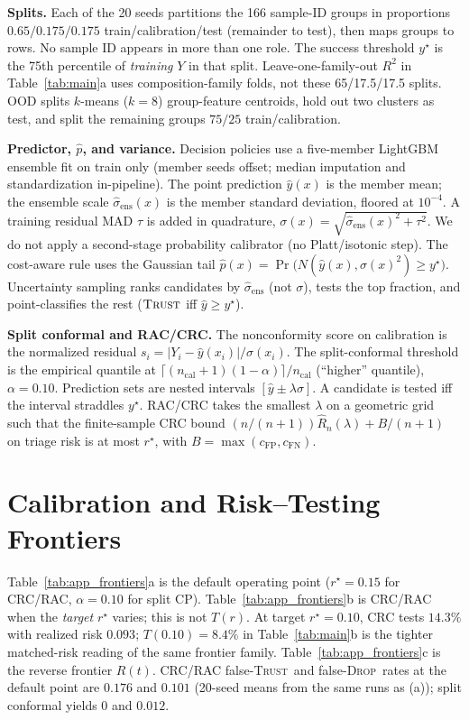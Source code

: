 \documentclass{article}
\newcommand{\trust}{\textsc{Trust}}
\newcommand{\dropa}{\textsc{Drop}}
\begin{document}
\textbf{Splits.}
Each of the 20 seeds partitions the 166 sample-ID groups in proportions $0.65/0.175/0.175$ train/calibration/test (remainder to test), then maps groups to rows.
No sample ID appears in more than one role.
The success threshold $y^\star$ is the 75th percentile of \emph{training} $Y$ in that split.
Leave-one-family-out $R^2$ in Table~\ref{tab:main}a uses composition-family folds, not these 65/17.5/17.5 splits.
OOD splits $k$-means ($k=8$) group-feature centroids, hold out two clusters as test, and split the remaining groups $75/25$ train/calibration.

\textbf{Predictor, $\hat p$, and variance.}
Decision policies use a five-member LightGBM ensemble fit on train only (member seeds offset; median imputation and standardization in-pipeline).
The point prediction $\hat y(x)$ is the member mean; the ensemble scale $\hat\sigma_{\mathrm{ens}}(x)$ is the member standard deviation, floored at $10^{-4}$.
A training residual MAD $\tau$ is added in quadrature,
$\sigma(x)=\sqrt{\hat\sigma_{\mathrm{ens}}(x)^2+\tau^2}$.
We do not apply a second-stage probability calibrator (no Platt/isotonic step).
The cost-aware rule uses the Gaussian tail
$\hat p(x)=\Pr\bigl(N(\hat y(x),\sigma(x)^2)\ge y^\star\bigr)$.
Uncertainty sampling ranks candidates by $\hat\sigma_{\mathrm{ens}}$ (not $\sigma$), tests the top fraction, and point-classifies the rest ($\trust$ iff $\hat y\ge y^\star$).

\textbf{Split conformal and RAC/CRC.}
The nonconformity score on calibration is the normalized residual
$s_i=|Y_i-\hat y(x_i)|/\sigma(x_i)$.
The split-conformal threshold is the empirical quantile at
$\lceil(n_{\mathrm{cal}}+1)(1-\alpha)\rceil/n_{\mathrm{cal}}$ (``higher'' quantile), $\alpha=0.10$.
Prediction sets are nested intervals $[\hat y\pm\lambda\sigma]$.
A candidate is tested iff the interval straddles $y^\star$.
RAC/CRC takes the smallest $\lambda$ on a geometric grid such that the finite-sample CRC bound
$(n/(n+1))\widehat R_n(\lambda)+B/(n+1)$ on triage risk is at most $r^\star$, with $B=\max(c_{\mathrm{FP}},c_{\mathrm{FN}})$.

\section{Calibration and Risk--Testing Frontiers}
\label{app:frontiers}

Table~\ref{tab:app_frontiers}a is the default operating point ($r^\star=0.15$ for CRC/RAC, $\alpha=0.10$ for split CP).
Table~\ref{tab:app_frontiers}b is CRC/RAC when the \emph{target} $r^\star$ varies; this is not $T(r)$.
At target $r^\star=0.10$, CRC tests $14.3\%$ with realized risk $0.093$; $T(0.10)=8.4\%$ in Table~\ref{tab:main}b is the tighter matched-risk reading of the same frontier family.
Table~\ref{tab:app_frontiers}c is the reverse frontier $R(t)$.
CRC/RAC false-\trust\ and false-\dropa\ rates at the default point are $0.176$ and $0.101$ (20-seed means from the same runs as (a)); split conformal yields $0$ and $0.012$.
\end{document}
